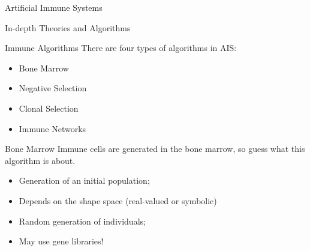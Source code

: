 \documentclass[xcolor=svgnames]{beamer}
\newcommand{\introframe}[2]{
    \begin{frame}
       \vfill
       \hfill\Huge{#1}
       
       \vspace{1em}
       
       \hfill\Large{#2}
       \vfill
    \end{frame}
}
\begin{document}
        \introframe{Artificial Immune Systems}{In-depth Theories and Algorithms}

        \begin{frame}{Immune Algorithms}
            There are four types of algorithms in AIS:

            \begin{itemize}
                \item Bone Marrow
                \item Negative Selection
                \item Clonal Selection
                \item Immune Networks
            \end{itemize}
        \end{frame}
        
        \begin{frame}{Bone Marrow}
            Immune cells are generated in the bone marrow, so guess what this algorithm is about.
            \begin{itemize}
                \item Generation of an initial population;
                \item Depends on the shape space (real-valued or symbolic)
                \item Random generation of individuals;
                \item May use gene libraries!
            \end{itemize}
        \end{frame}
        
\end{document}
